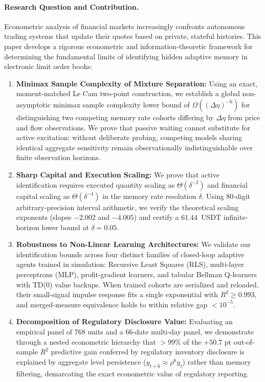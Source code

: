 \documentclass[11pt]{article}
\begin{document}
\paragraph{Research Question and Contribution.}
Econometric analysis of financial markets increasingly confronts autonomous trading systems that update their quotes based on private, stateful histories. This paper develops a rigorous econometric and information-theoretic framework for determining the fundamental limits of identifying hidden adaptive memory in electronic limit order books:
\begin{enumerate}
    \item \textbf{Minimax Sample Complexity of Mixture Separation:} Using an exact, moment-matched Le Cam two-point construction, we establish a global non-asymptotic minimax sample complexity lower bound of $\Omega((\Delta\eta)^{-6})$ for distinguishing two competing memory rate cohorts differing by $\Delta\eta$ from price and flow observations. We prove that passive waiting cannot substitute for active excitation: without deliberate probing, competing models sharing identical aggregate sensitivity remain observationally indistinguishable over finite observation horizons.
    \item \textbf{Sharp Capital and Execution Scaling:} We prove that active identification requires executed quantity scaling as $\Theta(\delta^{-2})$ and financial capital scaling as $\Theta(\delta^{-4})$ in the memory rate resolution $\delta$. Using 80-digit arbitrary-precision interval arithmetic, we verify the theoretical scaling exponents (slopes $-2.002$ and $-4.005$) and certify a $61.44$~USDT infinite-horizon lower bound at $\delta=0.05$.
    \item \textbf{Robustness to Non-Linear Learning Architectures:} We validate our identification bounds across four distinct families of closed-loop adaptive agents trained in simulation: Recursive Least Squares (RLS), multi-layer perceptrons (MLP), profit-gradient learners, and tabular Bellman Q-learners with TD(0) value backups. When trained cohorts are serialized and reloaded, their small-signal impulse response fits a single exponential with $R^2 \ge 0.993$, and merged-measure equivalence holds to within relative gap $< 10^{-5}$.
    \item \textbf{Decomposition of Regulatory Disclosure Value:} Evaluating an empirical panel of 768 units and a 66-date multi-day panel, we demonstrate through a nested econometric hierarchy that $>99\%$ of the $+50.7\text{ pt}$ out-of-sample $R^2$ predictive gain conferred by regulatory inventory disclosure is explained by aggregate level persistence ($y_{t+6} \approx \rho^6 y_t$) rather than memory filtering, demarcating the exact econometric value of regulatory reporting.
\end{enumerate}
\end{document}
